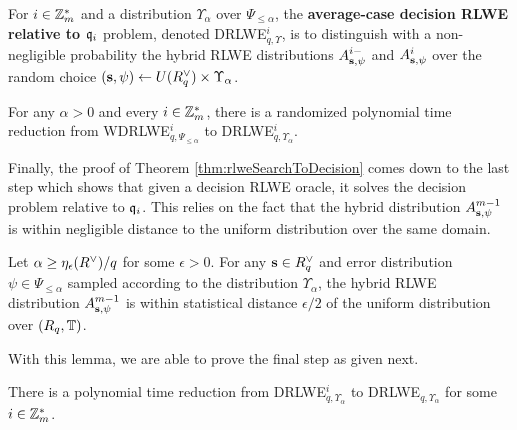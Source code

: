 \documentclass[../main.tex]{subfiles}
\begin{document}
\begin{definition}
For $i \in \mathbb{Z}_m^*$ and a distribution $\Upsilon_{\alpha}$ over $\Psi_{\le \alpha}$, the \textbf{average-case decision RLWE relative to $\mathfrak{q}_i$} problem, denoted DRLWE$_{q,\Upsilon}^i$, is to distinguish with a non-negligible probability the hybrid RLWE distributions $A_{\mathbf{s},\psi}^{i-}$ and $A_{\mathbf{s},\psi}^i$ over the random choice $(\mathbf{s}, \psi) \leftarrow U(R^{\vee}_q) \times \Upsilon_{\alpha}$.
\end{definition}

\begin{lemma}
\label{lm:rlweRed3}

For any $\alpha > 0$ and every $i \in \mathbb{Z}_m^*$, there is a randomized polynomial time reduction from WDRLWE$_{q,\Psi_{\le \alpha}}^i$ to DRLWE$_{q,\Upsilon_{\alpha}}^i$.

\end{lemma}

Finally, the proof of Theorem \ref{thm:rlweSearchToDecision} comes down to the last step which shows that given a decision RLWE oracle, it solves the decision problem relative to $\mathfrak{q}_i$. This relies on the fact that the hybrid distribution $A_{\mathbf{s},\psi}^{m-1}$ is within negligible distance to the uniform distribution over the same domain. 

\begin{lemma}
\label{lm:hybRLWECloseToUnif}
Let $\alpha \ge \eta_{\epsilon}(R^{\vee})/q$ for some $\epsilon > 0$. For any $\mathbf{s} \in R^{\vee}_q$ and error distribution $\psi \in \Psi_{\le \alpha}$ sampled according to the distribution $\Upsilon_{\alpha}$, the hybrid RLWE distribution $A_{\mathbf{s},\psi}^{m-1}$ is within statistical distance $\epsilon/2$ of the uniform distribution over $(R_q,\mathbb{T})$.
\end{lemma}

With this lemma, we are able to prove the final step as given next. 

\begin{lemma}
\label{lm:rlweRed4}
There is a polynomial time reduction from DRLWE$_{q,\Upsilon_{\alpha}}^i$ to DRLWE$_{q,\Upsilon_{\alpha}}$ for some $i \in \mathbb{Z}_m^*$.
\end{lemma}
\end{document}
